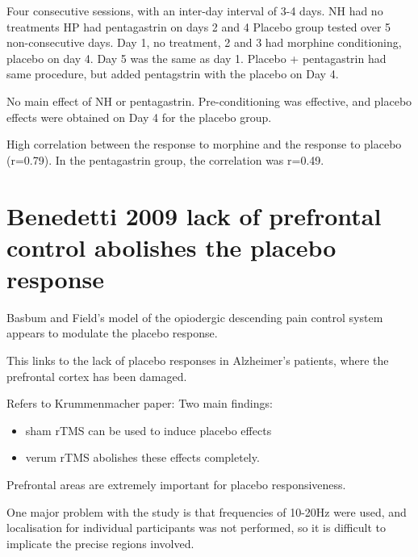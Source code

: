 \documentclass{article}
\begin{document}
Four consecutive sessions, with an inter-day interval of 3-4 days.
NH had no treatments
HP had pentagastrin on days 2 and 4
Placebo group tested over 5 non-consecutive days. Day 1, no treatment, 2 and 3 had morphine conditioning, placebo on day 4. Day 5 was the same as day 1.
Placebo + pentagastrin had same procedure, but added pentagstrin with the placebo on Day 4. 

No main effect of NH or pentagastrin. Pre-conditioning was effective, and placebo effects were obtained on Day 4 for the placebo group. 

High correlation between the response to morphine and the response to placebo (r=0.79). In the pentagastrin group, the correlation was r=0.49. 

\section{Benedetti 2009 lack of prefrontal control abolishes the placebo response}
\label{sec:benedetti-2009-lack}

Basbum and Field's model of the opiodergic descending pain control system appears to modulate the placebo response. 

This links to the lack of placebo responses in Alzheimer's patients, where the prefrontal cortex has been damaged. 

Refers to Krummenmacher paper:
Two main findings:
\begin{itemize}
\item sham rTMS can be used to induce placebo effects
\item verum rTMS abolishes these effects completely.
\end{itemize}

Prefrontal areas are extremely important for placebo responsiveness. 

One major problem with the study is that frequencies of 10-20Hz were used, and localisation for individual participants was not performed, so it is difficult to implicate the precise regions involved. 
\end{document}

